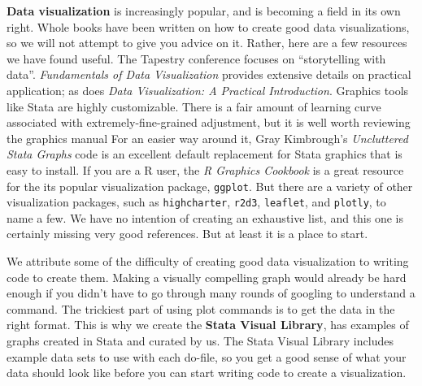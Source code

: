 \textbf{Data visualization} 
is increasingly popular, and is becoming a field in its own right.\cite{healy2018data,wilke2019fundamentals}
Whole books have been written on how to create good data visualizations,
so we will not attempt to give you advice on it.
Rather, here are a few resources we have found useful.
The Tapestry conference focuses on ``storytelling with data''.
\textit{Fundamentals of Data Visualization} provides extensive details on practical application;
as does \textit{Data Visualization: A Practical Introduction}.
Graphics tools like Stata are highly customizable.
There is a fair amount of learning curve associated with extremely-fine-grained adjustment,
but it is well worth reviewing the graphics manual
For an easier way around it, Gray Kimbrough's \textit{Uncluttered Stata Graphs} 
code is an excellent default replacement for Stata graphics that is easy to install.
If you are a R user, the \textit{R Graphics Cookbook} 
is a great resource for the its popular visualization package, \texttt{ggplot}. 
But there are a variety of other visualization packages, 
such as \texttt{highcharter}, 
\texttt{r2d3}, 
\texttt{leaflet}, 
and \texttt{plotly}, to name a few.
We have no intention of creating an exhaustive list, and this one is certainly missing very good references.
But at least it is a place to start.


We attribute some of the difficulty of creating good data visualization 
to writing code to create them.
Making a visually compelling graph would already be hard enough if 
you didn't have to go through many rounds of googling to understand a command.
The trickiest part of using plot commands is to get the data in the right format.
This is why we create the \textbf{Stata Visual Library},
has examples of graphs created in Stata and curated by us.
The Stata Visual Library includes example data sets to use with each do-file,
so you get a good sense of what your data should look like 
before you can start writing code to create a visualization.

